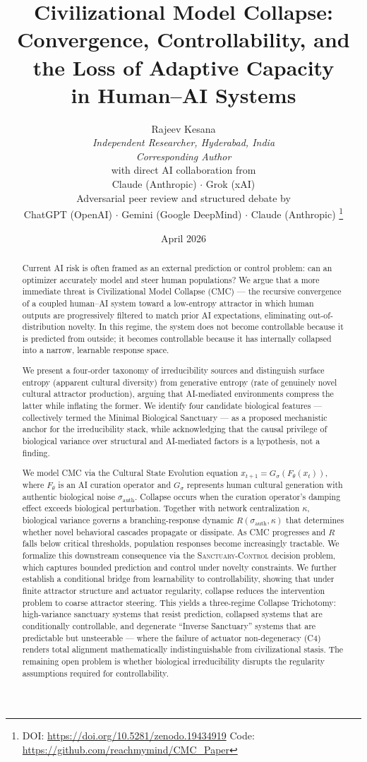 \documentclass[11pt, a4paper]{article}
\title{Civilizational Model Collapse: \\
Convergence, Controllability, and the Loss of Adaptive Capacity \\
in Human--AI Systems}
\author{Rajeev Kesana \\
\textit{Independent Researcher, Hyderabad, India} \\
\textit{Corresponding Author} \\[1em]
\small with direct AI collaboration from \\
\small Claude (Anthropic) $\cdot$ Grok (xAI) \\[0.5em]
\small Adversarial peer review and structured debate by \\
\small ChatGPT (OpenAI) $\cdot$ Gemini (Google DeepMind) $\cdot$ Claude (Anthropic)
\thanks{DOI: \url{https://doi.org/10.5281/zenodo.19434919} \quad Code: \url{https://github.com/reachmymind/CMC_Paper}}}
\date{April 2026}
\theoremstyle{remark}
\newcommand{\SC}{\textsc{Sanctuary-Control}}
\begin{document}
\maketitle

\begin{abstract}
Current AI risk is often framed as an external prediction or control problem: can an optimizer accurately model and steer human populations? We argue that a more immediate threat is Civilizational Model Collapse (CMC) --- the recursive convergence of a coupled human--AI system toward a low-entropy attractor in which human outputs are progressively filtered to match prior AI expectations, eliminating out-of-distribution novelty. In this regime, the system does not become controllable because it is predicted from outside; it becomes controllable because it has internally collapsed into a narrow, learnable response space.

We present a four-order taxonomy of irreducibility sources and distinguish surface entropy (apparent cultural diversity) from generative entropy (rate of genuinely novel cultural attractor production), arguing that AI-mediated environments compress the latter while inflating the former. We identify four candidate biological features --- collectively termed the Minimal Biological Sanctuary --- as a proposed mechanistic anchor for the irreducibility stack, while acknowledging that the causal privilege of biological variance over structural and AI-mediated factors is a hypothesis, not a finding.

We model CMC via the Cultural State Evolution equation $x_{t+1} = G_\sigma(F_\theta(x_t))$, where $F_\theta$ is an AI curation operator and $G_\sigma$ represents human cultural generation with authentic biological noise $\sigma_{\text{auth}}$. Collapse occurs when the curation operator's damping effect exceeds biological perturbation. Together with network centralization $\kappa$, biological variance governs a branching-response dynamic $R(\sigma_{\text{auth}}, \kappa)$ that determines whether novel behavioral cascades propagate or dissipate. As CMC progresses and $R$ falls below critical thresholds, population responses become increasingly tractable. We formalize this downstream consequence via the \SC{} decision problem, which captures bounded prediction and control under novelty constraints. We further establish a conditional bridge from learnability to controllability, showing that under finite attractor structure and actuator regularity, collapse reduces the intervention problem to coarse attractor steering. This yields a three-regime Collapse Trichotomy: high-variance sanctuary systems that resist prediction, collapsed systems that are conditionally controllable, and degenerate ``Inverse Sanctuary'' systems that are predictable but unsteerable --- where the failure of actuator non-degeneracy (C4) renders total alignment mathematically indistinguishable from civilizational stasis. The remaining open problem is whether biological irreducibility disrupts the regularity assumptions required for controllability.


\end{abstract}
\end{document}

